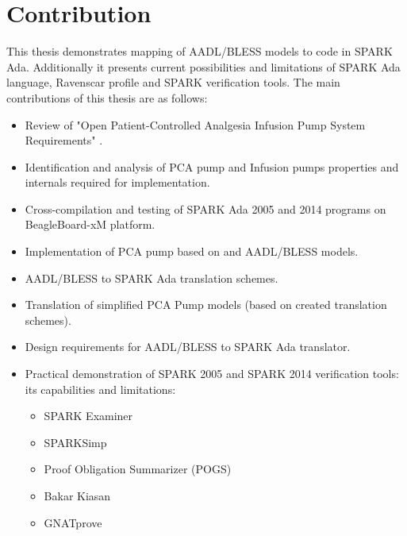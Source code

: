 \section{Contribution}
\label{introduction:contribution}
This thesis demonstrates mapping of AADL/BLESS models to code in SPARK Ada. Additionally it presents current possibilities and limitations of SPARK Ada language, Ravenscar profile and SPARK verification tools. The main contributions of this thesis are as follows:
\begin{itemize}
	\item Review of "Open Patient-Controlled Analgesia Infusion Pump System Requirements" \cite{PcaReq,OpenSourcePCAPump:Paper}.
	\item Identification and analysis of PCA pump and Infusion pumps properties and internals required for implementation.
	\item Cross-compilation and testing of SPARK Ada 2005 and 2014 programs on BeagleBoard-xM platform.
	\item Implementation of PCA pump based on \cite{PcaReq} and AADL/BLESS models.
	\item AADL/BLESS to SPARK Ada translation schemes.
	\item Translation of simplified PCA Pump models (based on created translation schemes).
	\item Design requirements for AADL/BLESS to SPARK Ada translator.
	\item Practical demonstration of SPARK 2005 and SPARK 2014 verification tools: its capabilities and limitations:
		\begin{itemize}
			\item SPARK Examiner
			\item SPARKSimp
			\item Proof Obligation Summarizer (POGS)
			\item Bakar Kiasan
			\item GNATprove
		\end{itemize}
\end{itemize}


